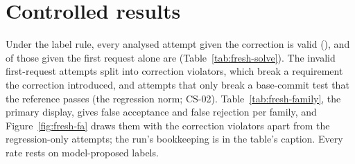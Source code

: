 \section{Controlled results}
\label{sec:results-controlled}
Under the label rule, every analysed attempt given the correction is valid (), and  of those given the first request alone are (Table~\ref{tab:fresh-solve}). The  invalid first-request attempts split into  correction violators, which break a requirement the correction introduced, and  attempts that only break a base-commit test that the reference passes (the regression norm; CS-02). Table~\ref{tab:fresh-family}, the primary display, gives false acceptance and false rejection per family, and Figure~\ref{fig:fresh-fa} draws them with the correction violators apart from the regression-only attempts; the run's bookkeeping is in the table's caption. Every rate rests on model-proposed labels.


